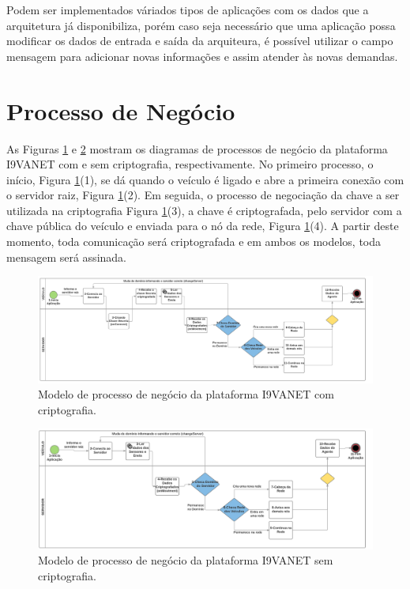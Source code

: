 \documentclass[
	12pt,				%
	oneside,			%
	a4paper,			%
	english,			%
	brazil				%
	]{abntex2ppgsi}
\begin{document}
Podem ser implementados váriados tipos de aplicações com os dados que a arquitetura já disponibiliza, porém caso seja necessário que uma aplicação possa modificar os dados de entrada e saída da arquiteura, é possível utilizar o campo mensagem para adicionar novas informações e assim atender às novas demandas.

\section{Processo de Negócio}

As Figuras \ref{fig:bpmcriptografia} e \ref{fig:bpm} mostram os diagramas de processos de negócio da plataforma I9VANET com e sem criptografia, respectivamente. No primeiro processo, o início, Figura \ref{fig:bpmcriptografia}(1), se dá quando o veículo é ligado e abre a primeira conexão com o servidor raiz, Figura \ref{fig:bpmcriptografia}(2). Em seguida, o processo de negociação da chave a ser utilizada na criptografia Figura \ref{fig:bpmcriptografia}(3), a chave é criptografada, pelo servidor com a chave pública do veículo e enviada  para o nó da rede, Figura \ref{fig:bpmcriptografia}(4). A partir deste momento, toda comunicação será criptografada e em ambos os modelos, toda mensagem será assinada. 

\begin{figure}[h!]
	\centering
	\includegraphics[width=1.0\columnwidth]{images/BPMCriptofrafado.png}
	\caption{Modelo de processo de negócio da plataforma I9VANET com criptografia.}
	\label{fig:bpmcriptografia}
\end{figure}

\begin{figure}[h!]
	\centering
	\includegraphics[width=0.9\columnwidth]{images/BPM.png}
	\caption{Modelo de processo de negócio da plataforma I9VANET sem criptografia.}
	\label{fig:bpm}
\end{figure}
\end{document}
